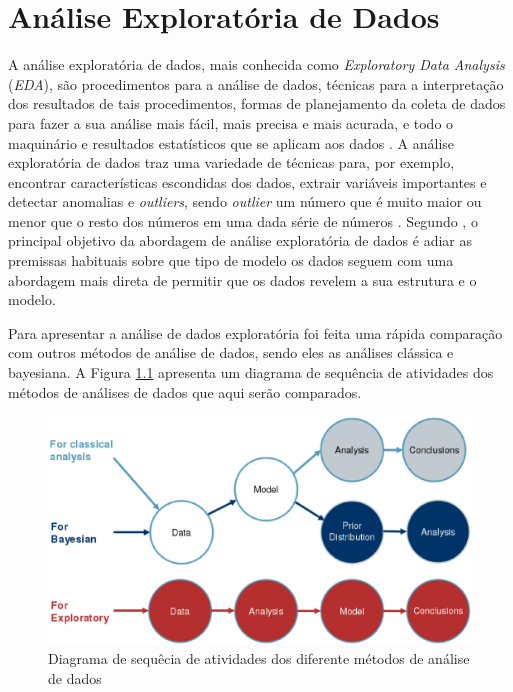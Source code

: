 \chapter{Análise Exploratória de Dados}\label{eda}

A análise exploratória de dados, mais conhecida como \textit{Exploratory Data
Analysis} (\textit{EDA}), são procedimentos para a análise de dados, técnicas
para a interpretação dos resultados de tais procedimentos, formas de
planejamento da coleta de dados para fazer a sua análise mais fácil, mais precisa
e mais acurada, e todo o maquinário e resultados estatísticos que se aplicam aos
dados \cite{tukey:1961}. A análise exploratória de dados traz uma variedade de
técnicas para, por exemplo, encontrar características escondidas dos dados,
extrair variáveis importantes e detectar anomalias e \textit{outliers}, sendo
\textit{outlier} um número que é muito maior ou menor que o resto dos números em
uma dada série de números \cite{hawkins80}. Segundo ,
o principal objetivo da abordagem de análise exploratória de dados é adiar as
premissas habituais sobre que tipo de modelo os dados seguem com uma abordagem
mais direta de permitir que os dados revelem a sua estrutura e o modelo.

Para apresentar a análise de dados exploratória foi feita uma rápida comparação
com outros métodos de análise de dados, sendo eles as análises clássica e
bayesiana. A Figura \ref{fig:analysis_comparacao} apresenta um diagrama de
sequência de atividades dos métodos de análises de dados que aqui serão
comparados.

\begin{figure}[h]
  \centering
  \includegraphics[width=1.0\textwidth]
      {figuras/analysis_comparacao}
      \caption{Diagrama de sequêcia de atividades dos diferente métodos de
      análise de dados \cite{wasiak:2012}}
  \label{fig:analysis_comparacao}
\end{figure}

